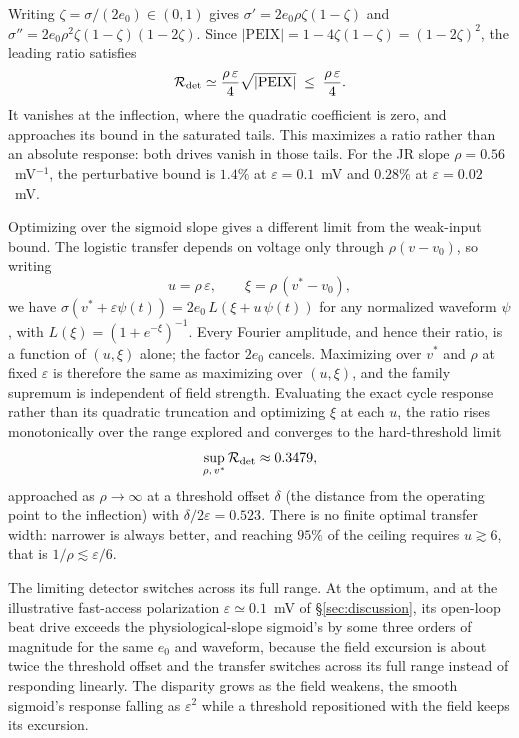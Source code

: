 \documentclass[11pt,a4paper]{article}
\newcommand{\Sig}{\sigma}
\begin{document}
Writing $\zeta=\Sig/(2e_0)\in(0,1)$ gives
$\Sig'=2e_0\rho\zeta(1-\zeta)$ and
$\Sig''=2e_0\rho^2\zeta(1-\zeta)(1-2\zeta)$. Since
$|\mathrm{PEIX}|=1-4\zeta(1-\zeta)=(1-2\zeta)^2$, the leading ratio satisfies
\begin{equation}
\mathcal R_{\rm det}\simeq\frac{\rho\,\varepsilon}{4}\sqrt{|\mathrm{PEIX}|}
\;\le\;\frac{\rho\,\varepsilon}{4}.
\label{eq:etabound}
\end{equation}
It vanishes at the inflection, where the quadratic coefficient is zero, and
approaches its bound in the saturated tails. This maximizes a ratio rather than
an absolute response: both drives vanish in those tails. For the JR slope
$\rho=0.56$~mV$^{-1}$, the perturbative bound is $1.4\%$ at
$\varepsilon=0.1$~mV and $0.28\%$ at $\varepsilon=0.02$~mV.

Optimizing over the sigmoid slope gives a different limit from the weak-input bound.
The logistic transfer depends on voltage only through $\rho(v-v_0)$, so writing
\begin{equation}
u=\rho\,\varepsilon,\qquad \xi=\rho\,(v^*-v_0),
\label{eq:reduced}
\end{equation}
we have $\Sig(v^*+\varepsilon\psi(t))=2e_0\,L(\xi+u\,\psi(t))$ for any normalized waveform $\psi$,
with $L(\xi)=(1+e^{-\xi})^{-1}$. Every Fourier amplitude, and hence their ratio, is a function
of $(u,\xi)$ alone; the factor $2e_0$ cancels. Maximizing over $v^*$ and $\rho$ at fixed
$\varepsilon$ is therefore the same as maximizing over $(u,\xi)$, and the family supremum is
independent of field strength. Evaluating the exact cycle response rather than its
quadratic truncation and optimizing $\xi$ at each $u$, the ratio rises monotonically over the
range explored and converges to the hard-threshold limit
\begin{equation}
\sup_{\rho,\,v^*}\mathcal R_{\rm det}\approx0.3479 ,
\label{eq:etasup}
\end{equation}
approached as $\rho\to\infty$ at a threshold offset $\delta$ (the distance from the
operating point to the inflection) with $\delta/2\varepsilon=0.523$. There is no
finite optimal transfer width: narrower is always better, and reaching $95\%$ of the ceiling
requires $u\gtrsim6$, that is $1/\rho\lesssim\varepsilon/6$.

The limiting detector switches across its full range. At the optimum,
and at the illustrative fast-access polarization $\varepsilon\!\simeq\!0.1$~mV
of \S\ref{sec:discussion}, its open-loop beat drive
exceeds the physiological-slope sigmoid's by some three orders of magnitude for the same
$e_0$ and waveform, because the field excursion is about twice the threshold offset and the
transfer switches across its full range instead of responding linearly. The disparity grows
as the field weakens, the smooth sigmoid's response falling as $\varepsilon^2$ while a
threshold repositioned with the field keeps its excursion.
\end{document}
